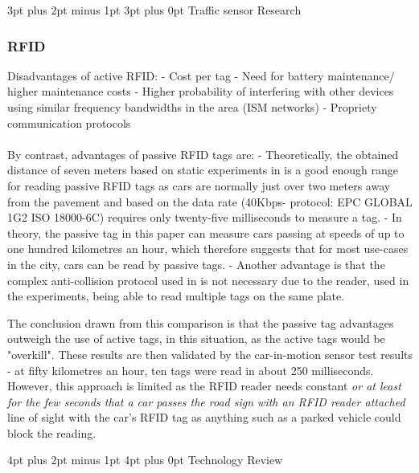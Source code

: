 \documentclass[12pt,a4paper]{article}
\makeatletter
\renewcommand\subsection{\@startsection {subsection}{1}{2mm} %
                               {3pt plus 2pt minus 1pt} %
                               {3pt plus 0pt} %
                               {\normalfont\bfseries}}
\renewcommand\section{\@startsection {section}{1}{0mm} %
                               {4pt plus 2pt minus 1pt} %
                               {4pt plus 0pt} %
                               {\bfseries}}
\makeatother
\begin{document}
\subsection{Traffic sensor Research}
\subsubsection{RFID}
Disadvantages of active RFID: 
- Cost per tag
- Need for battery maintenance/ higher maintenance costs
- Higher probability of interfering with other devices using similar frequency bandwidths in the area (ISM networks)
- Propriety communication protocols

\paragraph{}
By contrast, advantages of passive RFID tags are:
- Theoretically, the obtained distance of seven meters based on static experiments in \cite{GarciaOya2018} is a good enough range for reading passive RFID tags as cars are normally just over two meters away from the pavement and based on the data rate (40Kbps- protocol: EPC GLOBAL 1G2 ISO 18000-6C) requires only twenty-five milliseconds to measure a tag. 
- In theory, the passive tag in this paper can measure cars passing at speeds of up  to one hundred kilometres an hour, which therefore suggests that for most use-cases in the city, cars can be read by passive tags.
- Another advantage is that the complex anti-collision protocol used in \cite{GarciaOya2018} is not necessary due to the reader, used in the experiments, being able to read multiple tags on the same plate.

The conclusion drawn from this comparison is that the passive tag advantages outweigh the use of active tags, in this situation, as the active tags would be "overkill". These results are then validated by the car-in-motion sensor test results - at fifty kilometres an hour, ten tags were read in about 250 milliseconds. However, this approach is limited as the RFID reader needs constant \textit{or at least for the few seconds that a car passes the road sign with an RFID reader attached} line of sight with the car's RFID tag as anything such as a parked vehicle could block the reading. \cite{GarciaOya2018} 

\newpage
\section{Technology Review}
\end{document}

